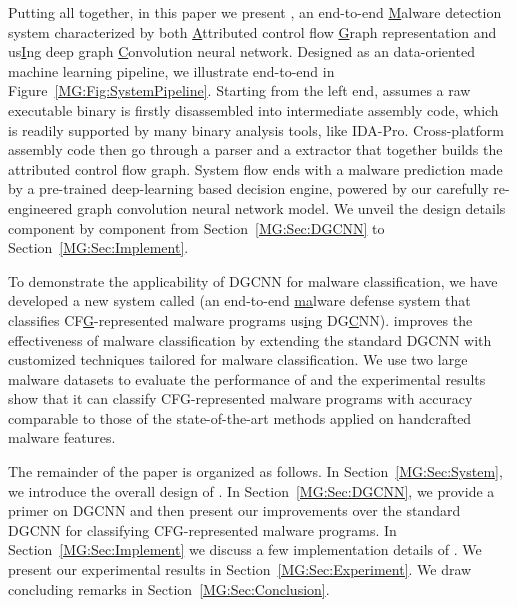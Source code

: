 Putting all together, in this paper we present \sysname,
an end-to-end \underline{M}alware detection system characterized by both \underline{A}ttributed control flow \underline{G}raph representation and
us\underline{I}ng deep graph \underline{C}onvolution neural network.
Designed as an data-oriented machine learning pipeline, we illustrate \sysname end-to-end in Figure~\ref{MG:Fig:SystemPipeline}.
Starting from the left end, \sysname assumes a raw executable binary is firstly disassembled into intermediate assembly code,
which is readily supported by many binary analysis tools, like IDA-Pro.
Cross-platform assembly code then go through a parser and a extractor that together builds the attributed control flow graph.
System flow ends with a malware prediction made by a pre-trained deep-learning based decision engine,
powered by our carefully re-engineered graph convolution neural network model.
We unveil the design details component by component from Section~\ref{MG:Sec:DGCNN} to Section~\ref{MG:Sec:Implement}.
\fi

To demonstrate the applicability of DGCNN for malware classification,
we have developed a new system called \sysname (an end-to-end \underline{ma}lware defense system that classifies CF\underline{G}-represented malware programs us\underline{i}ng DG\underline{C}NN).
\sysname improves the effectiveness of malware classification by extending the standard DGCNN with customized techniques tailored for malware classification.
We use two large malware datasets to evaluate the performance of \sysname and the experimental results show that it can classify CFG-represented malware programs with accuracy comparable to those of the state-of-the-art methods applied on handcrafted malware features.

The remainder of the paper is organized as follows.
In Section~\ref{MG:Sec:System}, we introduce the overall design of \sysname.
In Section~\ref{MG:Sec:DGCNN}, we provide a primer on DGCNN and then present our improvements over the standard DGCNN for classifying CFG-represented malware programs.
In Section~\ref{MG:Sec:Implement} we discuss a few implementation details of \sysname.
We present our experimental results in Section~\ref{MG:Sec:Experiment}.
We draw concluding remarks in Section~\ref{MG:Sec:Conclusion}.

